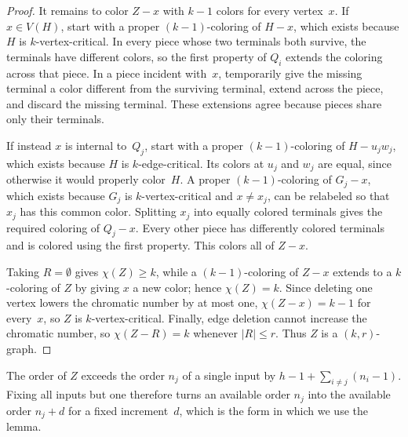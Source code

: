 \documentclass[11pt,letterpaper]{article}
\numberwithin{equation}{section}
\theoremstyle{plain}
\theoremstyle{definition}
\theoremstyle{remark}
\begin{document}
\begin{proof}
It remains to color $Z-x$ with $k-1$ colors for every vertex~$x$. If $x\in V(H)$, start with a proper $(k-1)$-coloring of $H-x$, which exists because $H$ is $k$-vertex-critical. In every piece whose two terminals both survive, the terminals have different colors, so the first property of $Q_i$ extends the coloring across that piece. In a piece incident with~$x$, temporarily give the missing terminal a color different from the surviving terminal, extend across the piece, and discard the missing terminal. These extensions agree because pieces share only their terminals.

If instead $x$ is internal to~$Q_j$, start with a proper $(k-1)$-coloring of $H-u_jw_j$, which exists because $H$ is $k$-edge-critical. Its colors at $u_j$ and $w_j$ are equal, since otherwise it would properly color~$H$. A proper $(k-1)$-coloring of $G_j-x$, which exists because $G_j$ is $k$-vertex-critical and $x\ne x_j$, can be relabeled so that $x_j$ has this common color. Splitting $x_j$ into equally colored terminals gives the required coloring of $Q_j-x$. Every other piece has differently colored terminals and is colored using the first property. This colors all of $Z-x$.

Taking $R=\emptyset$ gives $\chi(Z)\ge k$, while a $(k-1)$-coloring of $Z-x$ extends to a $k$-coloring of $Z$ by giving $x$ a new color; hence $\chi(Z)=k$. Since deleting one vertex lowers the chromatic number by at most one, $\chi(Z-x)=k-1$ for every~$x$, so $Z$ is $k$-vertex-critical. Finally, edge deletion cannot increase the chromatic number, so $\chi(Z-R)=k$ whenever $|R|\le r$. Thus $Z$ is a $(k,r)$-graph.
\end{proof}

The order of $Z$ exceeds the order $n_j$ of a single input by $h-1+\sum_{i\ne j}(n_i-1)$. Fixing all inputs but one therefore turns an available order $n_j$ into the available order $n_j+d$ for a fixed increment~$d$, which is the form in which we use the lemma.
\end{document}
